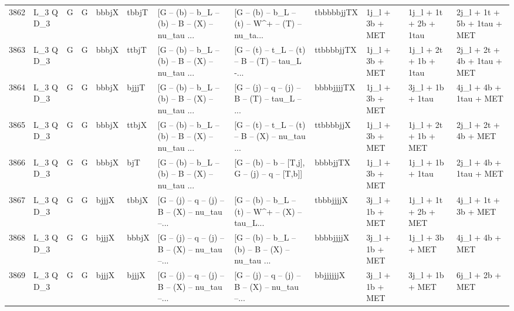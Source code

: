 \begin{tabular}{llllllllllll}
3862 &    L\_3 Q D\_3 &     G &     G &       bbbjX &       tbbjT &  [G -- (b) -- b\_L -- (b) -- B -- (X) -- nu\_tau ... &  [G -- (b) -- b\_L -- (t) -- W\textasciicircum + -- (T) -- nu\_ta... &  tbbbbbjjTX &          1j\_l + 3b + MET &    1j\_l + 1t + 2b + 1tau &        2j\_l + 1t + 5b + 1tau + MET \\
3863 &    L\_3 Q D\_3 &     G &     G &       bbbjX &       ttbjT &  [G -- (b) -- b\_L -- (b) -- B -- (X) -- nu\_tau ... &  [G -- (t) -- t\_L -- (t) -- B -- (T) -- tau\_L -... &  ttbbbbjjTX &          1j\_l + 3b + MET &    1j\_l + 2t + 1b + 1tau &        2j\_l + 2t + 4b + 1tau + MET \\
3864 &    L\_3 Q D\_3 &     G &     G &       bbbjX &       bjjjT &  [G -- (b) -- b\_L -- (b) -- B -- (X) -- nu\_tau ... &  [G -- (j) -- q -- (j) -- B -- (T) -- tau\_L -- ... &  bbbbjjjjTX &          1j\_l + 3b + MET &         3j\_l + 1b + 1tau &             4j\_l + 4b + 1tau + MET \\
3865 &    L\_3 Q D\_3 &     G &     G &       bbbjX &       ttbjX &  [G -- (b) -- b\_L -- (b) -- B -- (X) -- nu\_tau ... &  [G -- (t) -- t\_L -- (t) -- B -- (X) -- nu\_tau ... &   ttbbbbjjX &          1j\_l + 3b + MET &     1j\_l + 2t + 1b + MET &               2j\_l + 2t + 4b + MET \\
3866 &    L\_3 Q D\_3 &     G &     G &       bbbjX &         bjT &  [G -- (b) -- b\_L -- (b) -- B -- (X) -- nu\_tau ... &   [G -- (b) -- b -- [T,j], G -- (j) -- q -- [T,b]] &    bbbbjjTX &          1j\_l + 3b + MET &         1j\_l + 1b + 1tau &             2j\_l + 4b + 1tau + MET \\
3867 &    L\_3 Q D\_3 &     G &     G &       bjjjX &       tbbjX &  [G -- (j) -- q -- (j) -- B -- (X) -- nu\_tau --... &  [G -- (b) -- b\_L -- (t) -- W\textasciicircum + -- (X) -- tau\_L... &   tbbbjjjjX &          3j\_l + 1b + MET &     1j\_l + 1t + 2b + MET &               4j\_l + 1t + 3b + MET \\
3868 &    L\_3 Q D\_3 &     G &     G &       bjjjX &       bbbjX &  [G -- (j) -- q -- (j) -- B -- (X) -- nu\_tau --... &  [G -- (b) -- b\_L -- (b) -- B -- (X) -- nu\_tau ... &   bbbbjjjjX &          3j\_l + 1b + MET &          1j\_l + 3b + MET &                    4j\_l + 4b + MET \\
3869 &    L\_3 Q D\_3 &     G &     G &       bjjjX &       bjjjX &  [G -- (j) -- q -- (j) -- B -- (X) -- nu\_tau --... &  [G -- (j) -- q -- (j) -- B -- (X) -- nu\_tau --... &   bbjjjjjjX &          3j\_l + 1b + MET &          3j\_l + 1b + MET &                    6j\_l + 2b + MET \\

\end{tabular}
